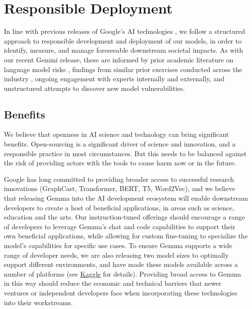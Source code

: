 \documentclass[11pt, a4paper, logo, twocolumn, copyright, nonumbering]{googledeepmind}
\begin{document}
\section{Responsible Deployment}
\label{safety}

In line with previous releases of Google’s AI technologies \citep{geminiteam2023gemini,alphafoldRelease}, we follow a structured approach to responsible development and deployment of our models, in order to identify, measure, and manage foreseeable downstream societal impacts. As with our recent Gemini release, these are informed by prior academic literature on language model risks \citep{weidinger}, findings from similar prior exercises conducted across the industry \citep{anil2023palm}, ongoing engagement with experts internally and externally, and unstructured attempts to discover new model vulnerabilities.

\subsection{Benefits}
We believe that openness in AI science and technology can bring significant benefits. Open-sourcing is a significant driver of science and innovation, and a responsible practice in most circumstances. But this needs to be balanced against the risk of providing actors with the tools to cause harm now or in the future. 

Google has long committed to providing broader access to successful research innovations (GraphCast, Transformer, BERT, T5, Word2Vec), and we believe that releasing Gemma into the AI development ecosystem will enable downstream developers to create a host of beneficial applications, in areas such as science, education and the arts. Our instruction-tuned offerings should encourage a range of developers to leverage Gemma’s chat and code capabilities to support their own beneficial applications, while allowing for custom fine-tuning to specialize the model’s capabilities for specific use cases. To ensure Gemma supports a wide range of developer needs, we are also releasing two model sizes to optimally support different environments, and have made these models available across a number of platforms (see \href{https://www.kaggle.com/models/google/gemma/frameworks/flax/variations/7b-it}{Kaggle} for details). Providing broad access to Gemma in this way should reduce the economic and technical barriers that newer ventures or independent developers face when incorporating these technologies into their workstreams.
\end{document}
